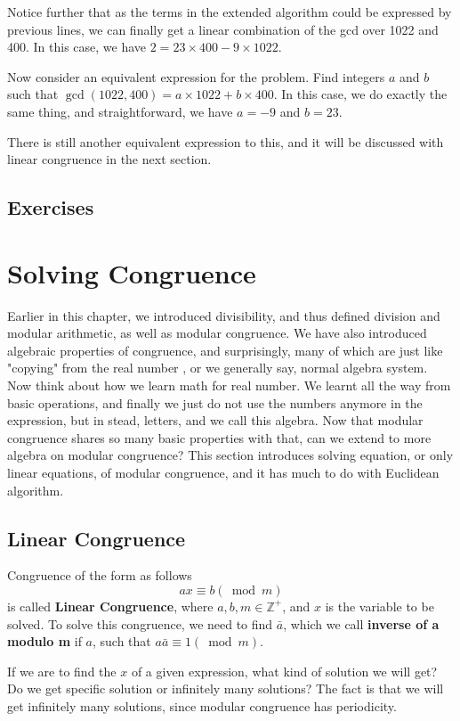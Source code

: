         Notice further that as the terms in the extended algorithm could be expressed by previous lines, we can finally get a linear combination
        of the gcd over 1022 and 400. In this case, we have $2 = 23\times 400-9\times 1022$.

        Now consider an equivalent expression for the problem.  Find integers $a$ and $b$ such that $\gcd(1022, 400) = a \times 1022 + b \times 400$.
        In this case, we do exactly the same thing, and straightforward, we have $a=-9$ and $b=23$.

        There is still another equivalent expression to this, and it will be discussed with linear congruence in the next section.



    \subsection{Exercises}


    
    
    \section{Solving Congruence}
        Earlier in this chapter, we introduced divisibility, and thus defined division and modular arithmetic, as well as modular congruence.
        We have also introduced algebraic properties of congruence, and surprisingly, many of which are just like "copying" from the real number
        , or we generally say, normal algebra system. Now think about how we learn math for real number. We learnt all the way from basic operations, and finally we just do not use the numbers anymore in the expression, but in stead, letters, and we call this algebra. Now that modular congruence
        shares so many basic properties with that, can we extend to more algebra on modular congruence? This section introduces solving equation, or only
        linear equations, of modular congruence, and it has much to do with Euclidean algorithm.
            

        \subsection{Linear Congruence}
            \begin{definition}
                Congruence of the form as follows
                $$ax \equiv b (\bmod m)$$
                is called \textbf{Linear Congruence}, where $a, b,  m \in \mathbb{Z}^+$, and $x$ is the variable to be solved.
                To solve this congruence, we need to find $\bar{a}$, which we call \textbf{inverse of a modulo m} if $a$, such that
                $a\bar{a} \equiv 1 (\bmod m)$.
            \end{definition}
        If we are to find the $x$ of a given expression, what kind of solution we will get? Do we get 
        specific solution or infinitely many solutions? The fact is that we will get infinitely many
        solutions, since modular congruence has periodicity.

